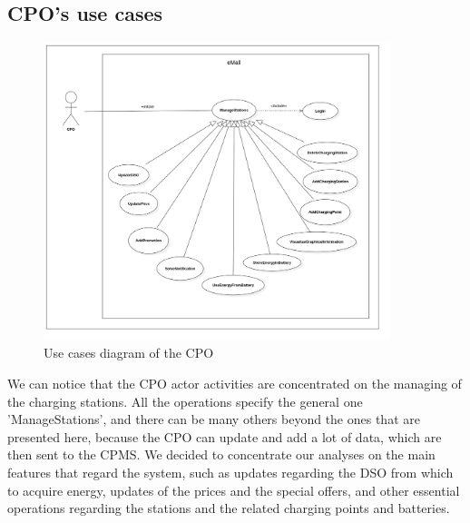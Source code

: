 \subsection{CPO's use cases}
\begin{figure}[H]
    \centering
    \includegraphics[width= 0.9\textwidth, trim={1cm 2cm 2cm 1cm}, clip]{Images/cp3/UseCaseDiagramCPO.png}
    \caption{Use cases diagram of the CPO}
\end{figure}
We can notice that the CPO actor activities are concentrated on the managing of the charging stations. All the operations specify the general one 'ManageStations', and there can be many others beyond the ones that are presented here, because the CPO can update and add a lot of data, which are then sent to the CPMS. We decided to concentrate our analyses on the main features that regard the system, such as updates regarding the DSO from which to acquire energy, updates of the prices and the special offers, and other essential operations regarding the stations and the related charging points and batteries.

\clearpage
